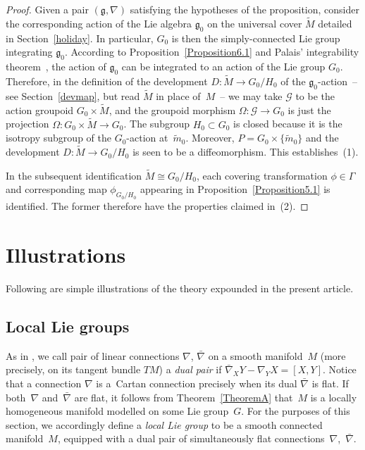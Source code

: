 \documentclass[pdftex]{sigma}
\numberwithin{equation}{section}
\begin{document}
\begin{proof}
  Given a pair $({\mathfrak g}, \nabla)$ satisfying the hypotheses of
  the proposition, consider the correspon\-ding action of the Lie
  algebra ${\mathfrak g}_0$ on the universal cover $\tilde M$ detailed
  in Section~\ref{holiday}. In particular, $G_0$ is then the
  simply-connected Lie group integrating ${\mathfrak g}_0$. According
  to Proposition~\ref{Proposition6.1} and Palais' integrability
  theorem~\cite{Palais_57a}, the action of ${\mathfrak g}_0$ can be
  integrated to an action of the Lie group $G_0$. Therefore, in the
  def\/inition of the development $D \colon \tilde M \rightarrow
  G_0/H_0$ of the ${\mathfrak g}_0$-action~-- see Section~\ref{devmap}, but
  read $\tilde M$ in place of~$M$~-- we may take ${\mathcal G}$ to be
  the action groupoid $G_0 \times \tilde M$, and the groupoid morphism
  $\Omega \colon {\mathcal G} \rightarrow G_0 $ is just the projection
  $\Omega \colon G_0 \times \tilde M \rightarrow G_0$.
  The subgroup $H_0 \subset G_0$ is closed because it is the isotropy subgroup of the $G_0$-action at~$\tilde m_0$.
   Moreover,
  $P=G_0 \times \{\tilde m_0\}$ and the development $D \colon \tilde M
  \rightarrow G_0/H_0$ is seen to be a dif\/feomorphism. This
  establishes~(1).

  In the subsequent identif\/ication $\tilde M \cong {G_0/H_0}$, each
  covering transformation $\phi \in \Gamma$ and corresponding map
  $\phi_{G_0/H_0} $ appearing in Proposition~\ref{Proposition5.1} is
  identif\/ied. The former therefore have the properties claimed in~(2).
\end{proof}

\section{Illustrations}\label{illustration}
Following are simple illustrations of the theory expounded in the
present article.

\subsection{Local Lie groups}\label{when}
As in \cite{Blaom_05}, we call pair of linear connections $\nabla $,
$\bar\nabla $ on a smooth manifold~$M$ (more precisely, on its tangent
bundle $TM$) a {\it dual pair} if
$\bar\nabla_XY-\nabla_YX=[X,Y]$. Notice that a connection $\nabla $ is
a~Cartan connection precisely when its dual $\bar\nabla $ is f\/lat. If
both~$\nabla $ and~$\bar\nabla $ are f\/lat, it follows from Theorem~\ref{TheoremA}
that~$M$ is a locally homogeneous manifold modelled on some Lie group~$G$. For the purposes of this section, we accordingly def\/ine a {\it
  local Lie group} to be a smooth connected manifold~$M$, equipped with
a dual pair of simultaneously f\/lat connections~$\nabla $,~$\bar\nabla
$.
\end{document}
